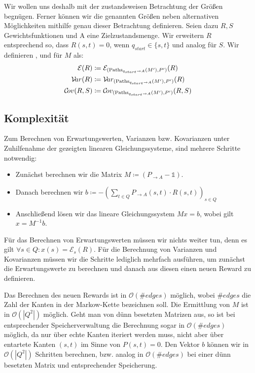 \documentclass[a4paper]{article}
\newcommand{\mc}{Markow-Kette}
\theoremstyle{nonumberplain}
\begin{document}
Wir wollen uns deshalb mit der zustandsweisen Betrachtung der Größen begnügen. Ferner können wir die genannten Größen neben alternativen Mög\-lich\-keit\-en mithilfe genau dieser Betrachtung definieren. Seien dazu $R, S$ Gewichtsfunktionen und A eine Zielzustandsmenge. Wir erweitern $R$ entsprechend so, dass $R(s,t) = 0$, wenn $q_{start} \in \{s,t\}$ und analog für $S$. Wir definieren \expect{}, \var{} und \cov{} für $M$ als:
\begin{align*}
\mathcal{E}(R) \coloneqq \;& \mathcal{E}_{(\mathrm{Paths}_{q_{start} \rightarrow A}(M'), P')}(R) \\
\mathcal{V}\!ar(R) \coloneqq \;& \mathcal{V}\!ar_{(\mathrm{Paths}_{q_{start} \rightarrow A}(M'), P')}(R) \\
\mathcal{C}\!ov(R,S) \coloneqq \;& \mathcal{C}\!ov_{(\mathrm{Paths}_{q_{start} \rightarrow A}(M'), P')}(R,S) \\
\end{align*}
	
\subsection{Komplexität}

Zum Berechnen von Erwartungswerten, Varianzen bzw. Kovarianzen unter Zuhilfenahme der gezeigten linearen Gleichungssysteme, sind mehrere Schritte notwendig:

\begin{itemize}
	\item Zunächst berechnen wir die Matrix $M \coloneqq (P_{\rightarrow A} - \mathbb{1})$.
	\item Danach berechnen wir $b \coloneqq - \left(\sum_{t \in Q}{ P_{\rightarrow A}(s,t) \cdot R(s,t) }\right)_{s \in Q}$
	\item Anschließend lösen wir das lineare Gleichungssystem $Mx = b$, wobei gilt $x = M^{-1}b$.
\end{itemize}

Für das Berechnen von Erwartungswerten müssen wir nichts weiter tun, denn es gilt $\forall s\in Q : x(s) = \mathcal{E}_s(R)$.
Für die Berechnung von Varianzen und Kovarianzen müssen wir die Schritte lediglich mehrfach ausführen, um zunächst die Erwartungswerte zu berechnen und danach aus diesen einen neuen Reward zu definieren.

Das Berechnen des neuen Rewards ist in $\mathcal{O}(\#edges)$ möglich, wobei $\#edges$ die Zahl der Kanten in der \mc{} bezeichnen soll. Die Ermittlung von $M$ ist in $\mathcal{O}(|Q^2|)$ möglich. Geht man von dünn besetzten Matrizen aus, so ist bei entsprechender Speicherverwaltung die Berechnung sogar in $\mathcal{O}(\#edges)$ möglich, da nur über echte Kanten iteriert werden muss, nicht aber über entartete Kanten $(s,t)$ im Sinne von $P(s,t) = 0$. Den Vektor $b$ können wir in $\mathcal{O}(|Q^2|)$ Schritten berechnen, bzw. analog in $\mathcal{O}(\#edges)$ bei einer dünn besetzten Matrix und entsprechender Speicherung.
\end{document}
